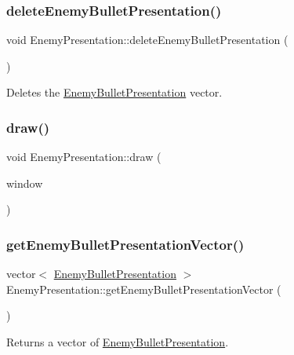 \subsubsection{\texorpdfstring{delete\+Enemy\+Bullet\+Presentation()}{deleteEnemyBulletPresentation()}}
{\footnotesize\ttfamily void Enemy\+Presentation\+::delete\+Enemy\+Bullet\+Presentation (\begin{DoxyParamCaption}{ }\end{DoxyParamCaption})}



Deletes the \hyperlink{class_enemy_bullet_presentation}{Enemy\+Bullet\+Presentation} vector. 

\mbox{\label{class_enemy_presentation_a9af0b870bea65e9fa170f6eb20394265}} 
\subsubsection{\texorpdfstring{draw()}{draw()}}
{\footnotesize\ttfamily void Enemy\+Presentation\+::draw (\begin{DoxyParamCaption}\item[{Render\+Window \&}]{window }\end{DoxyParamCaption})}

\mbox{\label{class_enemy_presentation_a64c5863ad2f83c1414cf69882293e4b9}} 
\subsubsection{\texorpdfstring{get\+Enemy\+Bullet\+Presentation\+Vector()}{getEnemyBulletPresentationVector()}}
{\footnotesize\ttfamily vector$<$ \hyperlink{class_enemy_bullet_presentation}{Enemy\+Bullet\+Presentation} $>$ Enemy\+Presentation\+::get\+Enemy\+Bullet\+Presentation\+Vector (\begin{DoxyParamCaption}{ }\end{DoxyParamCaption})}



Returns a vector of \hyperlink{class_enemy_bullet_presentation}{Enemy\+Bullet\+Presentation}. 

